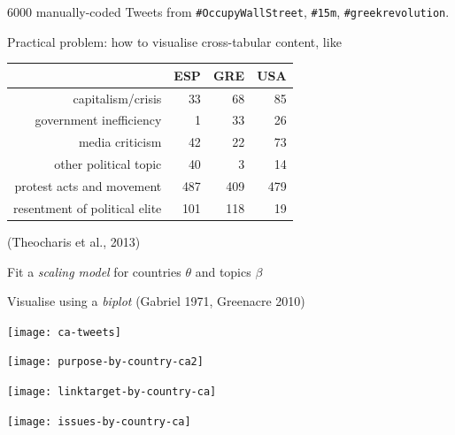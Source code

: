 \documentclass{mediumfoils}
\newcommand{\mkgrey}[1]{{\color{pale}#1}}
\begin{document}


6000 manually-coded Tweets from \texttt{\#OccupyWallStreet}, \texttt{\#15m}, \texttt{\#greekrevolution}. 

Practical problem: how to visualise cross-tabular content, like
\begin{center}
{\footnotesize
\begin{tabular}{rrrr}
  \toprule
 & ESP & GRE & USA \\ 
  \midrule
  capitalism/crisis &  33 &  68 &  85 \\ 
  government inefficiency &   1 &  33 &  26 \\ 
  media criticism &  42 &  22 &  73 \\ 
  other political topic &  40 &   3 &  14 \\ 
  protest acts and movement & 487 & 409 & 479 \\ 
  resentment of political elite & 101 & 118 &  19 \\ 
  \bottomrule
\end{tabular}
}
\end{center}
\mkgrey{(Theocharis et al., 2013)}



Fit a \textit{scaling model} for countries $\theta$ and topics $\beta$

Visualise using a \textit{biplot} \mkgrey{(Gabriel 1971, Greenacre 2010)}

 
\newpage

\centerline{\texttt{[image: ca-tweets]}}
\centerline{\texttt{[image: purpose-by-country-ca2]}}
\centerline{\texttt{[image: linktarget-by-country-ca]}}
\centerline{\texttt{[image: issues-by-country-ca]}}
\end{document}
